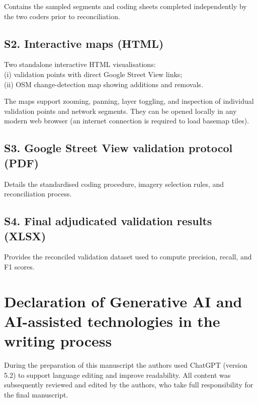 \documentclass[
]{article}
\begin{document}
Contains the sampled segments and coding sheets completed independently
by the two coders prior to reconciliation.

\subsection*{S2. Interactive maps (HTML)}\label{s2-interactive-maps}

Two standalone interactive HTML visualisations:\\
(i) validation points with direct Google Street View links;\\
(ii) OSM change-detection map showing additions and removals.

The maps support zooming, panning, layer toggling, and inspection of
individual validation points and network segments. They can be opened
locally in any modern web browser (an internet connection is required to
load basemap tiles).

\subsection*{S3. Google Street View validation protocol
(PDF)}\label{s3-gsv-protocol}

Details the standardised coding procedure, imagery selection rules, and
reconciliation process.

\subsection*{S4. Final adjudicated validation results
(XLSX)}\label{s4-joined-results}

Provides the reconciled validation dataset used to compute precision,
recall, and F1 scores.

\section*{Declaration of Generative AI and AI-assisted technologies in
the writing
process}\label{declaration-of-generative-ai-and-ai-assisted-technologies-in-the-writing-process}

During the preparation of this manuscript the authors used ChatGPT
(version 5.2) to support language editing and improve readability. All
content was subsequently reviewed and edited by the authors, who take
full responsibility for the final manuscript.
\end{document}
